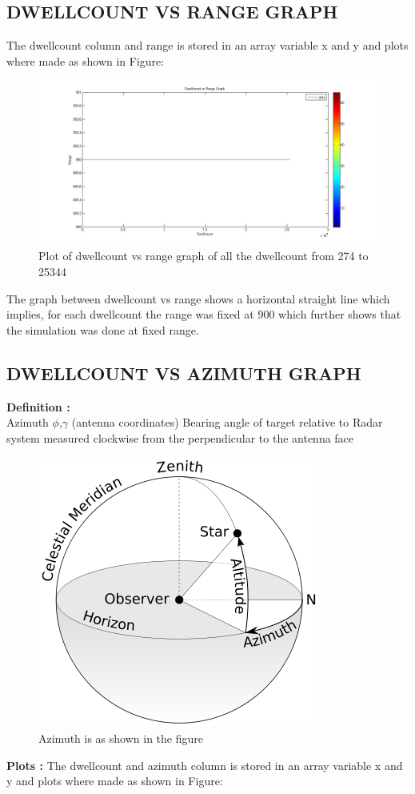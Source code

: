 \documentclass[12pt]{article} %
\begin{document}
\subsection{DWELLCOUNT VS RANGE GRAPH}
The dwellcount column   and range is stored in an array variable x and y and plots where made as shown in Figure:
 \begin{figure}[H]
\includegraphics[width=\linewidth]{dwellcount-range(1,25067).jpg}
  \caption{Plot of dwellcount vs range graph of all the dwellcount from 274 to 25344}
  \label{fig:figure 28}
  \end{figure}
  \begin{tcolorbox}[title =\textbf{Analysis}]
  The graph between dwellcount vs range shows a horizontal straight line which implies, for each dwellcount the range was fixed at 900 which further shows that the simulation was done at fixed range.
  \end{tcolorbox}
  \subsection{DWELLCOUNT VS AZIMUTH GRAPH}
  \noindent \textbf{Definition : }\\
   \indent Azimuth $\phi$,$\gamma$ (antenna coordinates) Bearing angle of target relative to Radar system measured clockwise from the perpendicular to the antenna face 
   \begin{figure}[H]
   \centering
\includegraphics[width=0.4\linewidth]{azimuth.png}
  \caption{Azimuth is as shown in the figure}
  \label{fig:figure 29}
  \end{figure}
  \noindent \textbf{Plots : }The dwellcount and azimuth column is stored in an array variable x and y and plots where made as shown in Figure:
\end{document}
